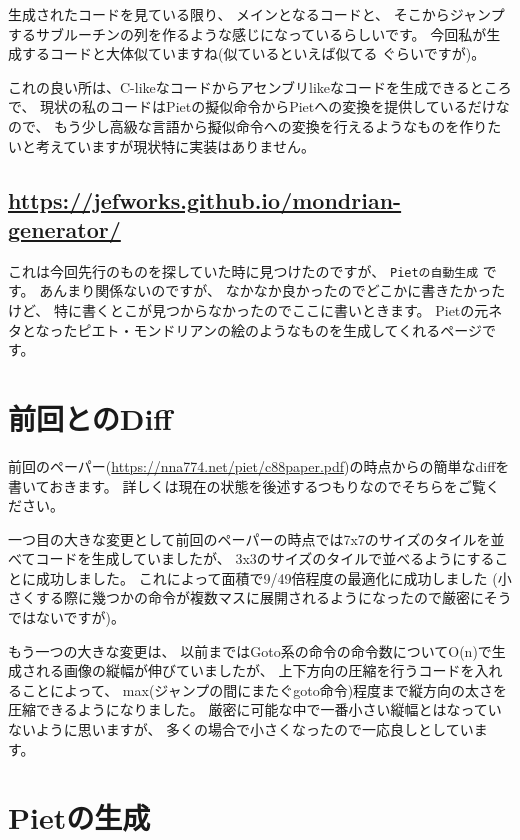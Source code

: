 生成されたコードを見ている限り、 メインとなるコードと、
そこからジャンプするサブルーチンの列を作るような感じになっているらしいです。
今回私が生成するコードと大体似ていますね(似ているといえば似てる ぐらいですが)。

これの良い所は、C-likeなコードからアセンブリlikeなコードを生成できるところで、
現状の私のコードはPietの擬似命令からPietへの変換を提供しているだけなので、
もう少し高級な言語から擬似命令への変換を行えるようなものを作りたいと考えていますが現状特に実装はありません。

\subsection{\texorpdfstring{\url{https://jefworks.github.io/mondrian-generator/}}{https://jefworks.github.io/mondrian-generator/}}

これは今回先行のものを探していた時に見つけたのですが、
\texttt{Pietの自動生成} です。 あんまり関係ないのですが、
なかなか良かったのでどこかに書きたかったけど、
特に書くとこが見つからなかったのでここに書いときます。
Pietの元ネタとなったピエト・モンドリアンの絵のようなものを生成してくれるページです。

\section{前回とのDiff}

前回のペーパー(\url{https://nna774.net/piet/c88paper.pdf})の時点からの簡単なdiffを書いておきます。
詳しくは現在の状態を後述するつもりなのでそちらをご覧ください。

一つ目の大きな変更として前回のペーパーの時点では7x7のサイズのタイルを並べてコードを生成していましたが、
3x3のサイズのタイルで並べるようにすることに成功しました。
これによって面積で9/49倍程度の最適化に成功しました
(小さくする際に幾つかの命令が複数マスに展開されるようになったので厳密にそうではないですが)。

もう一つの大きな変更は、
以前まではGoto系の命令の命令数についてO(n)で生成される画像の縦幅が伸びていましたが、
上下方向の圧縮を行うコードを入れることによって、
max(ジャンプの間にまたぐgoto命令)程度まで縦方向の太さを圧縮できるようになりました。
厳密に可能な中で一番小さい縦幅とはなっていないように思いますが、
多くの場合で小さくなったので一応良しとしています。

\section{Pietの生成}

